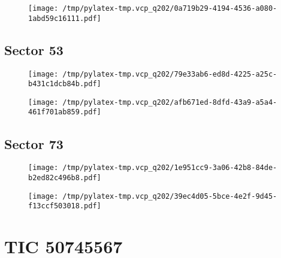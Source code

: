 \documentclass{report}%
\begin{document}
%


\begin{figure}[H]%
\begin{center}%
\centering%
\texttt{[image: /tmp/pylatex-tmp.vcp\_q202/0a719b29-4194-4536-a080-1abd59c16111.pdf]}%
\end{center}%
\end{figure}

%
\subsection{Sector 53}%
\label{subsec:40298066453}%


\begin{figure}[H]%
\begin{center}%
\centering%
\texttt{[image: /tmp/pylatex-tmp.vcp\_q202/79e33ab6-ed8d-4225-a25c-b431c1dcb84b.pdf]}%
\end{center}%
\end{figure}

%


\begin{figure}[H]%
\begin{center}%
\centering%
\texttt{[image: /tmp/pylatex-tmp.vcp\_q202/afb671ed-8dfd-43a9-a5a4-461f701ab859.pdf]}%
\end{center}%
\end{figure}

%
\subsection{Sector 73}%
\label{subsec:40298066473}%


\begin{figure}[H]%
\begin{center}%
\centering%
\texttt{[image: /tmp/pylatex-tmp.vcp\_q202/1e951cc9-3a06-42b8-84de-b2ed82c496b8.pdf]}%
\end{center}%
\end{figure}

%


\begin{figure}[H]%
\begin{center}%
\centering%
\texttt{[image: /tmp/pylatex-tmp.vcp\_q202/39ec4d05-5bce-4e2f-9d45-f13ccf503018.pdf]}%
\end{center}%
\end{figure}

%
\section{TIC 50745567}%
\label{sec:TIC50745567}%
\end{document}
